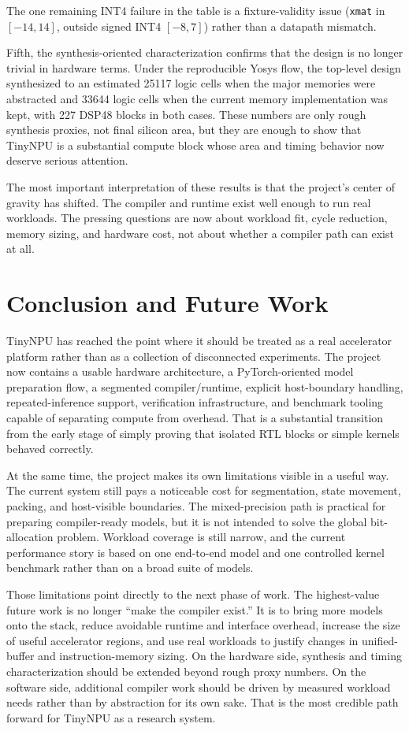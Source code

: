 \documentclass[a4paper, 12pt, titlepage]{article}
\begin{document}
The one remaining INT4 failure in the table is a fixture-validity issue (\texttt{xmat} in \([-14,14]\), outside signed INT4 \([-8,7]\)) rather than a datapath mismatch.

Fifth, the synthesis-oriented characterization confirms that the design is no longer trivial in hardware terms. Under the reproducible Yosys flow, the top-level design synthesized to an estimated 25117 logic cells when the major memories were abstracted and 33644 logic cells when the current memory implementation was kept, with 227 DSP48 blocks in both cases. These numbers are only rough synthesis proxies, not final silicon area, but they are enough to show that TinyNPU is a substantial compute block whose area and timing behavior now deserve serious attention.

The most important interpretation of these results is that the project’s center of gravity has shifted. The compiler and runtime exist well enough to run real workloads. The pressing questions are now about workload fit, cycle reduction, memory sizing, and hardware cost, not about whether a compiler path can exist at all.

\newpage
\section{Conclusion and Future Work}
TinyNPU has reached the point where it should be treated as a real accelerator platform rather than as a collection of disconnected experiments. The project now contains a usable hardware architecture, a PyTorch-oriented model preparation flow, a segmented compiler/runtime, explicit host-boundary handling, repeated-inference support, verification infrastructure, and benchmark tooling capable of separating compute from overhead. That is a substantial transition from the early stage of simply proving that isolated RTL blocks or simple kernels behaved correctly.

At the same time, the project makes its own limitations visible in a useful way. The current system still pays a noticeable cost for segmentation, state movement, packing, and host-visible boundaries. The mixed-precision path is practical for preparing compiler-ready models, but it is not intended to solve the global bit-allocation problem. Workload coverage is still narrow, and the current performance story is based on one end-to-end model and one controlled kernel benchmark rather than on a broad suite of models.

Those limitations point directly to the next phase of work. The highest-value future work is no longer ``make the compiler exist.'' It is to bring more models onto the stack, reduce avoidable runtime and interface overhead, increase the size of useful accelerator regions, and use real workloads to justify changes in unified-buffer and instruction-memory sizing. On the hardware side, synthesis and timing characterization should be extended beyond rough proxy numbers. On the software side, additional compiler work should be driven by measured workload needs rather than by abstraction for its own sake. That is the most credible path forward for TinyNPU as a research system.

\newpage

 
\end{document}
